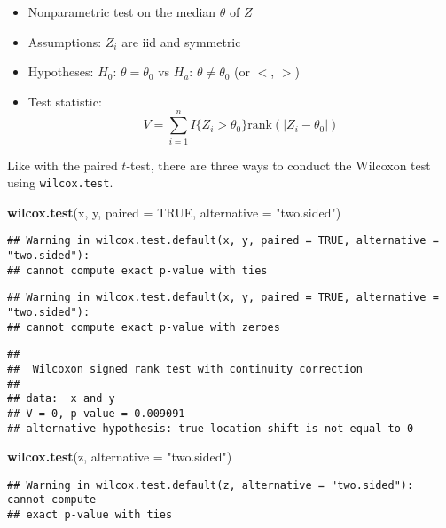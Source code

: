 \documentclass[
]{book}
\newenvironment{Shaded}{\begin{snugshade}}{\end{snugshade}}
\newcommand{\DataTypeTok}[1]{\textcolor[rgb]{0.13,0.29,0.53}{#1}}
\newcommand{\KeywordTok}[1]{\textcolor[rgb]{0.13,0.29,0.53}{\textbf{#1}}}
\newcommand{\NormalTok}[1]{#1}
\newcommand{\OtherTok}[1]{\textcolor[rgb]{0.56,0.35,0.01}{#1}}
\newcommand{\StringTok}[1]{\textcolor[rgb]{0.31,0.60,0.02}{#1}}
\providecommand{\tightlist}{%
  \setlength{\itemsep}{0pt}\setlength{\parskip}{0pt}}
\begin{document}
\begin{itemize}
\tightlist
\item
  Nonparametric test on the median \(\theta\) of \(Z\)
\item
  Assumptions: \(Z_i\) are iid and symmetric
\item
  Hypotheses: \(H_0\): \(\theta = \theta_0\) vs \(H_a\): \(\theta \neq \theta_0\) (or \(<\), \(>\))
\item
  Test statistic: \[V = \sum_{i = 1}^n I\{Z_i > \theta_0\} \mathrm{rank}(|Z_i - \theta_0|)\]
\end{itemize}

Like with the paired \(t\)-test, there are three ways to conduct the Wilcoxon test
using \texttt{wilcox.test}.

\begin{Shaded}
\begin{Highlighting}[]
\KeywordTok{wilcox.test}\NormalTok{(x, y, }\DataTypeTok{paired =} \OtherTok{TRUE}\NormalTok{, }\DataTypeTok{alternative =} \StringTok{"two.sided"}\NormalTok{)}
\end{Highlighting}
\end{Shaded}

\begin{verbatim}
## Warning in wilcox.test.default(x, y, paired = TRUE, alternative = "two.sided"):
## cannot compute exact p-value with ties
\end{verbatim}

\begin{verbatim}
## Warning in wilcox.test.default(x, y, paired = TRUE, alternative = "two.sided"):
## cannot compute exact p-value with zeroes
\end{verbatim}

\begin{verbatim}
## 
##  Wilcoxon signed rank test with continuity correction
## 
## data:  x and y
## V = 0, p-value = 0.009091
## alternative hypothesis: true location shift is not equal to 0
\end{verbatim}

\begin{Shaded}
\begin{Highlighting}[]
\KeywordTok{wilcox.test}\NormalTok{(z, }\DataTypeTok{alternative =} \StringTok{"two.sided"}\NormalTok{)}
\end{Highlighting}
\end{Shaded}

\begin{verbatim}
## Warning in wilcox.test.default(z, alternative = "two.sided"): cannot compute
## exact p-value with ties
\end{verbatim}
\end{document}
